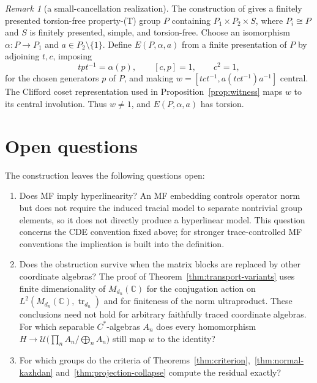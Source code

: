 \documentclass[11pt]{amsart}
\theoremstyle{definition}
\theoremstyle{remark}
\newtheorem{remark}[theorem]{Remark}
\theoremstyle{plain}
\newcommand{\C}{\mathbb C}
\newcommand{\U}{\mathcal U}
\newcommand{\tr}{\operatorname{tr}}
\begin{document}
\begin{remark}[a small-cancellation realization]
\label{rem:ff-realization}
The construction of \cite[\S2]{FFF} gives a finitely presented torsion-free
property-\textup{(T)} group $P$ containing
$P_1\times P_2\times S$, where $P_i\cong P$ and $S$ is finitely presented,
simple, and torsion-free.  Choose an isomorphism
$\alpha\colon P\to P_1$ and $a\in P_2\setminus\{1\}$.  Define
$E(P,\alpha,a)$ from a finite presentation of $P$ by adjoining $t,c$, imposing
\[
 tpt^{-1}=\alpha(p),\qquad [c,p]=1,\qquad c^2=1,
\]
for the chosen generators $p$ of $P$, and making
$w=[tct^{-1},a(tct^{-1})a^{-1}]$ central.  The Clifford coset representation
used in Proposition~\ref{prop:witness} maps $w$ to its central involution.
Thus $w\ne1$, and $E(P,\alpha,a)$ has torsion.
\end{remark}

\section{Open questions}

The construction leaves the following questions open:
\begin{enumerate}
\item Does MF imply hyperlinearity?  An MF embedding controls
operator norm but does not require the induced tracial model to
separate nontrivial group elements, so it does not directly produce a
hyperlinear model.  This
question concerns the CDE convention fixed above; for stronger
trace-controlled MF conventions the implication is built into the definition.
\item Does the obstruction survive when the matrix blocks are replaced
by other coordinate algebras?  The proof of
Theorem~\ref{thm:transport-variants} uses finite dimensionality of
$M_{d_n}(\C)$ for the conjugation action on
$L^2(M_{d_n}(\C),\tr_{d_n})$ and for finiteness of the norm
ultraproduct.  These conclusions need not hold for arbitrary faithfully
traced coordinate algebras.  For
which separable $C^*$-algebras $A_n$ does every homomorphism
$H\to\U\bigl(\prod_nA_n/\bigoplus_nA_n\bigr)$ still map $w$ to the
identity?
\item For which groups do the criteria of
Theorems~\ref{thm:criterion},~\ref{thm:normal-kazhdan}
and~\ref{thm:projection-collapse} compute the residual exactly?
\end{enumerate}
\end{document}
